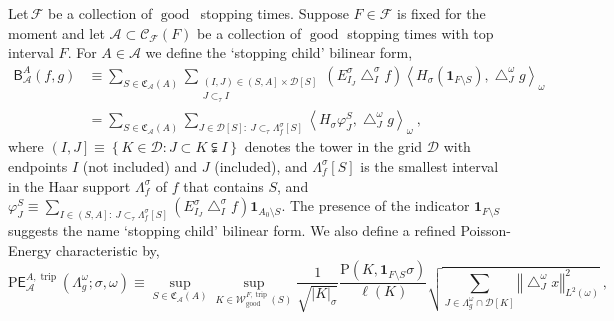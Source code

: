 \documentclass{amsart}%
\theoremstyle{plain}
\numberwithin{equation}{section}
\begin{document}
Let$\,\mathcal{F}$ be a collection of $\operatorname{good}$\ stopping times.
Suppose $F\in\mathcal{F}$ is fixed for the moment and let $\mathcal{A}%
\subset\mathcal{C}_{\mathcal{F}}\left(  F\right)  $ be a collection of
$\operatorname{good}$ stopping times with top interval $F$. For $A\in
\mathcal{A}$ we define the `stopping child' bilinear form,%
\begin{align*}
\mathsf{B}_{\mathcal{A}}^{A}\left(  f,g\right)   & \equiv\sum_{S\in
\mathfrak{C}_{\mathcal{A}}\left(  A\right)  }\sum_{\substack{\left(
I,J\right)  \in\left(  S,A\right]  \times\mathcal{D}\left[  S\right]
\\J\subset_{\tau}I}}\left(  E_{I_{J}}^{\sigma}\bigtriangleup_{I}^{\sigma
}f\right)  \left\langle H_{\sigma}\left(  \mathbf{1}_{F\setminus S}\right)
,\bigtriangleup_{J}^{\omega}g\right\rangle _{\omega}\\
& =\sum_{S\in\mathfrak{C}_{\mathcal{A}}\left(  A\right)  }\sum_{J\in
\mathcal{D}\left[  S\right]  :\ J\subset_{\tau}\Lambda_{f}^{\sigma}\left[
S\right]  }\left\langle H_{\sigma}\varphi_{J}^{S},\bigtriangleup_{J}^{\omega
}g\right\rangle _{\omega}\ ,
\end{align*}
where $\left(  I,J\right]  \equiv\left\{  K\in\mathcal{D}:J\subset
K\subsetneqq I\right\}  $ denotes the tower in the grid $\mathcal{D}$ with
endpoints $I$ (not included) and $J$ (included), and $\Lambda_{f}^{\sigma
}\left[  S\right]  $ is the smallest interval in the Haar support $\Lambda
_{f}^{\sigma}$ of $f$ that contains $S$, and $\varphi_{J}^{S}\equiv\sum
_{I\in\left(  S,A\right]  :\ J\subset_{\tau}\Lambda_{f}^{\sigma}\left[
S\right]  }\left(  E_{I_{J}}^{\sigma}\bigtriangleup_{I}^{\sigma}f\right)
\mathbf{1}_{A_{0}\setminus S}$. The presence of the indicator $\mathbf{1}%
_{F\setminus S}$ suggests the name `stopping child' bilinear form. We also
define a refined Poisson-Energy characteristic by,%
\begin{equation}
\mathrm{P}\mathsf{E}_{\mathcal{A}}^{A,\operatorname*{trip}}\left(  \Lambda
_{g}^{\omega};\sigma,\omega\right)  \equiv\sup_{S\in\mathfrak{C}_{\mathcal{A}%
}\left(  A\right)  }\sup_{K\in\mathcal{W}_{\operatorname{good}}%
^{F,\operatorname*{trip}}\left(  S\right)  }\frac{1}{\sqrt{\left\vert
K\right\vert _{\sigma}}}\frac{\mathrm{P}\left(  K,\mathbf{1}_{F\setminus
S}\sigma\right)  }{\ell\left(  K\right)  }\sqrt{\sum_{J\in\Lambda_{g}^{\omega
}\cap\mathcal{D}\left[  K\right]  }\left\Vert \bigtriangleup_{J}^{\omega
}x\right\Vert _{L^{2}\left(  \omega\right)  }^{2}}\ ,\label{refined PE char}%
\end{equation}
\end{document}
